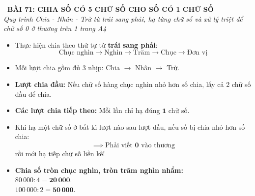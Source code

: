\documentclass[11pt,a4paper]{article}
\begin{document}
\begin{tcolorbox}[
  enhanced,
  colback=white,
  colframe=primary,
  arc=3mm,
  boxrule=1.2pt,
  left=4mm, right=4mm, top=2.5mm, bottom=2.5mm,
  drop shadow=black!10!white
]
  \centering
  {\Large\bfseries\color{primary}\faBookmark\ BÀI 71: CHIA SỐ CÓ 5 CHỮ SỐ CHO SỐ CÓ 1 CHỮ SỐ}\\[1.5mm]
  {\small\itshape\color{black!75}Quy trình Chia - Nhân - Trừ từ trái sang phải, hạ từng chữ số và xử lý triệt để chữ số 0 ở thương trên 1 trang A4}
\end{tcolorbox}

\vspace{-2mm}


\noindent
\begin{minipage}[t]{0.49\textwidth}\vspace{0pt}
\begin{tcolorbox}[
  enhanced,
  colback=blue!4!white,
  colframe=blue!75!black,
  arc=2mm, boxrule=0.8pt,
  left=2mm, right=2mm, top=1.8mm, bottom=1.8mm,
  title={\footnotesize\bfseries\color{white}\faCalculator\ 1. Quy trình Đặt tính và Chia}
]
{\footnotesize
\begin{itemize}\setlength{\itemsep}{1.5pt}\setlength{\leftskip}{-2.5mm}
  \item Thực hiện chia theo thứ tự từ \textbf{trái sang phải}:
  $$\text{Chục nghìn} \to \text{Nghìn} \to \text{Trăm} \to \text{Chục} \to \text{Đơn vị}$$
  \item Mỗi lượt chia gồm đủ 3 nhịp: Chia $\to$ Nhân $\to$ Trừ.
  \item \textbf{Lượt chia đầu:} Nếu chữ số hàng chục nghìn nhỏ hơn số chia, lấy cả 2 chữ số đầu để chia.
  \item \textbf{Các lượt chia tiếp theo:} Mỗi lần chỉ hạ đúng $\mathbf{1}$ chữ số.
\end{itemize}
}
\end{tcolorbox}
\end{minipage}
\hfill
\begin{minipage}[t]{0.49\textwidth}\vspace{0pt}
\begin{tcolorbox}[
  enhanced,
  colback=teal!4!white,
  colframe=teal!75!black,
  arc=2mm, boxrule=0.8pt,
  left=2mm, right=2mm, top=1.8mm, bottom=1.8mm,
  title={\footnotesize\bfseries\color{white}\faKey\ 2. Kĩ thuật chữ số 0 ở thương}
]
{\footnotesize
\begin{itemize}\setlength{\itemsep}{1.5pt}\setlength{\leftskip}{-2.5mm}
  \item Khi hạ một chữ số ở bất kì lượt nào sau lượt đầu, nếu số bị chia nhỏ hơn số chia:
  $$\implies \text{Phải viết } \mathbf{0} \text{ vào thương}$$
  rồi mới hạ tiếp chữ số liền kề!
  \item \textbf{Chia số tròn chục nghìn, tròn trăm nghìn nhẩm:}\\
  $80\,000 : 4 = \mathbf{20\,000}$.\\
  $100\,000 : 2 = \mathbf{50\,000}$.
\end{itemize}
}
\end{tcolorbox}
\end{minipage}
\end{document}
